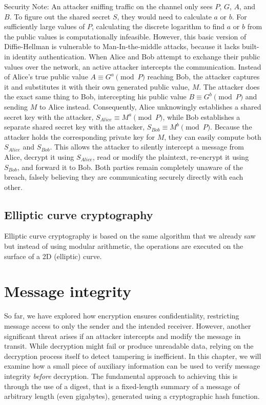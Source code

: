 Security Note: An attacker sniffing traffic on the channel only sees $P$, $G$, $A$, and $B$. To figure out the shared secret $S$, they would need to calculate $a$ or $b$.
For sufficiently large values of $P$, calculating the discrete logarithm to find $a$ or $b$ from the public values is computationally infeasible.
However, this basic version of Diffie-Hellman is vulnerable to Man-In-the-middle attacks, because it lacks built-in identity authentication.
When Alice and Bob attempt to exchange their public values over the network, an active attacker intercepts the communication.
Instead of Alice's true public value $A \equiv G^a \pmod{P}$ reaching Bob, the attacker captures it and substitutes it with their own generated public value, $M$.
The attacker does the exact same thing to Bob, intercepting his public value $B \equiv G^b \pmod{P}$ and sending $M$ to Alice instead.
Consequently, Alice unknowingly establishes a shared secret key with the attacker, $S_{Alice} \equiv M^a \pmod{P}$, while Bob establishes a separate shared secret key with the attacker, $S_{Bob} \equiv M^b \pmod{P}$.
Because the attacker holds the corresponding private key for $M$, they can easily compute both $S_{Alice}$ and $S_{Bob}$.
This allows the attacker to silently intercept a message from Alice, decrypt it using $S_{Alice}$, read or modify the plaintext, re-encrypt it using $S_{Bob}$, and forward it to Bob.
Both parties remain completely unaware of the breach, falsely believing they are communicating securely directly with each other.


\subsection{Elliptic curve cryptography}
Elliptic curve cryptography is based on the same algorithm that we already saw but instead of using modular arithmetic, the operations are executed on
the surface of a 2D (elliptic) curve.

\section{Message integrity}
So far, we have explored how encryption ensures confidentiality, restricting message access to only the sender and the intended receiver. However, another significant threat arises if an attacker intercepts and modify the message in transit. While decryption might fail or produce unreadable data, relying on the decryption process itself to detect tampering is inefficient. In this chapter, we will examine how a small piece of auxiliary information can be used to verify message integrity \textit{before} decryption. The fundamental approach to achieving this is through the use of a digest, that is a fixed-length summary of a message of arbitrary length (even gigabytes), generated using a cryptographic hash function.

